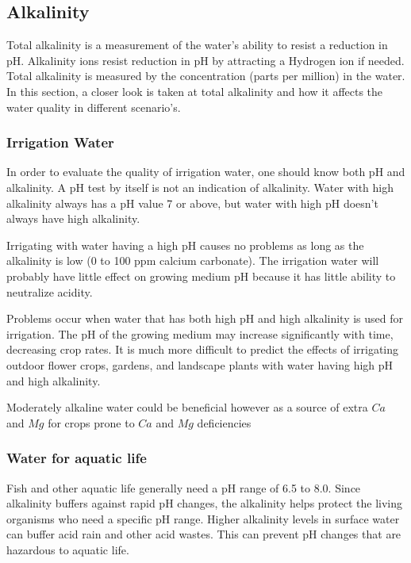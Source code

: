 \newpage
\subsection{Alkalinity}
Total alkalinity is a measurement of the water’s ability to resist a reduction in pH. Alkalinity ions resist reduction in pH by attracting a Hydrogen ion if needed. Total alkalinity is measured by the concentration (parts per million) in the water. \cite{standardmethods} In this section, a closer look is taken at total alkalinity and how it affects the water quality in different scenario's.

\subsubsection{Irrigation Water}
In order to evaluate the quality of irrigation water, one should know both pH and alkalinity. A pH test by itself is not an indication of alkalinity. Water with high alkalinity always has a pH value 7 or above, but water with high pH doesn't always have high alkalinity. 

Irrigating with water having a high pH causes no problems as long as the alkalinity is low (0 to 100 ppm calcium carbonate). The irrigation water will probably have little effect on growing medium pH because it has little ability to neutralize acidity.

Problems occur when water that has both high pH and high alkalinity is used for irrigation. The pH of the growing medium may increase significantly with time, decreasing crop rates. It is much more difficult to predict the effects of irrigating outdoor flower crops, gardens, and landscape plants with water having high pH and high alkalinity. 

Moderately alkaline water could be beneficial however as a source of extra $Ca$ and $Mg$ for crops prone to $Ca$ and $Mg$ deficiencies \cite{umassalkalinity}

\subsubsection{Water for aquatic life}
Fish and other aquatic life generally need a pH range of 6.5 to 8.0. \cite{fishphghkh} Since alkalinity buffers against rapid pH changes, the alkalinity helps protect the living organisms who need a specific pH range. Higher alkalinity levels in surface water can buffer acid rain and other acid wastes. This can prevent pH changes that are hazardous to aquatic life. 

